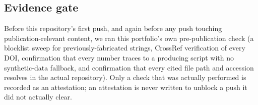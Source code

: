 \subsection{Evidence gate}
Before this repository's first push, and again before any push touching
publication-relevant content, we ran this portfolio's own pre-publication check (a
blocklist sweep for previously-fabricated strings, CrossRef verification of every DOI,
confirmation that every number traces to a producing script with no synthetic-data
fallback, and confirmation that every cited file path and accession resolves in the actual
repository). Only a check that was actually performed is recorded as an attestation; an
attestation is never written to unblock a push it did not actually clear.
